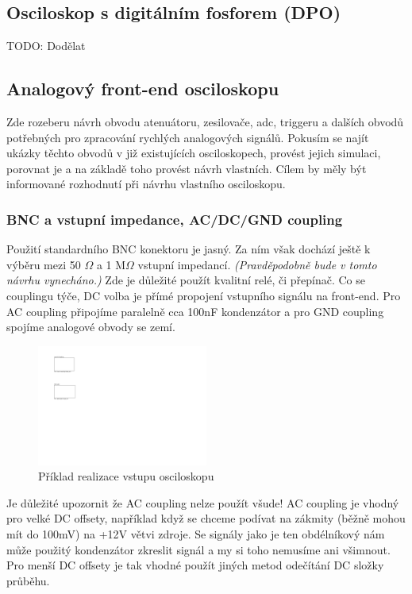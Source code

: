 \documentclass[12pt]{article}
\begin{document}
\subsection{Osciloskop s digitálním fosforem (DPO)}

TODO: Dodělat

\subsection{Analogový front-end osciloskopu}

Zde rozeberu návrh obvodu atenuátoru, zesilovače, \acrshort{adc}, triggeru a dalších obvodů
potřebných pro zpracování rychlých analogových signálů. Pokusím se najít ukázky těchto obvodů
v již existujících osciloskopech, provést jejich simulaci, porovnat je a na základě toho
provést návrh vlastních. Cílem by měly být informované rozhodnutí při návrhu vlastního osciloskopu.

\subsubsection{BNC a vstupní impedance, AC/DC/GND coupling}

Použití standardního BNC konektoru je jasný. Za ním však dochází ještě k výběru mezi 50 $\Omega$ a 1 M$\Omega$
vstupní impedancí. \emph{(Pravděpodobně bude v tomto návrhu vynecháno.)} Zde je důležité použít
kvalitní relé, či přepínač. Co se couplingu týče,
DC volba je přímé propojení vstupního signálu na front-end. Pro AC coupling připojíme paralelně cca
100nF kondenzátor a pro GND coupling spojíme analogové obvody se zemí.

\begin{figure}[h]
    \centering
    \includegraphics[width=0.5\textwidth, page=2]{kicad-export}
    \caption{Příklad realizace vstupu osciloskopu}
    \label{fig:input-example}
\end{figure}

Je důležité upozornit že AC coupling nelze použít všude! AC coupling je vhodný pro velké DC offsety,
například když se chceme podívat na zákmity (běžně mohou mít do 100mV) na +12V větvi zdroje.
Se signály jako je ten obdélníkový nám může použitý kondenzátor zkreslit signál a my si toho
nemusíme ani všimnout. Pro menší DC offsety je tak vhodné použít jiných metod odečítání DC
složky průběhu.
\end{document}
